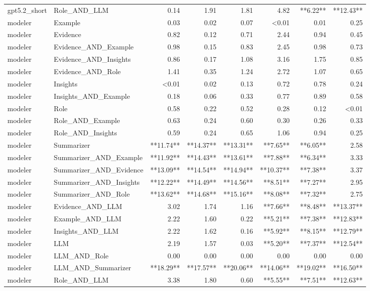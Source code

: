 \begin{tabular}{llrrrrrr}
gpt5.2_short & Role_AND_LLM & 0.14 & 1.91 & 1.81 & 4.82 & **6.22** & **12.43** \\
modeler & Example & 0.03 & 0.02 & 0.07 & <0.01 & 0.01 & 0.25 \\
modeler & Evidence & 0.82 & 0.12 & 0.71 & 2.44 & 0.94 & 0.45 \\
modeler & Evidence_AND_Example & 0.98 & 0.15 & 0.83 & 2.45 & 0.98 & 0.73 \\
modeler & Evidence_AND_Insights & 0.86 & 0.17 & 1.08 & 3.16 & 1.75 & 0.85 \\
modeler & Evidence_AND_Role & 1.41 & 0.35 & 1.24 & 2.72 & 1.07 & 0.65 \\
modeler & Insights & <0.01 & 0.02 & 0.13 & 0.72 & 0.78 & 0.24 \\
modeler & Insights_AND_Example & 0.18 & 0.06 & 0.33 & 0.77 & 0.89 & 0.58 \\
modeler & Role & 0.58 & 0.22 & 0.52 & 0.28 & 0.12 & <0.01 \\
modeler & Role_AND_Example & 0.63 & 0.24 & 0.60 & 0.30 & 0.26 & 0.33 \\
modeler & Role_AND_Insights & 0.59 & 0.24 & 0.65 & 1.06 & 0.94 & 0.25 \\
modeler & Summarizer & **11.74** & **14.37** & **13.31** & **7.65** & **6.05** & 2.58 \\
modeler & Summarizer_AND_Example & **11.92** & **14.43** & **13.61** & **7.88** & **6.34** & 3.33 \\
modeler & Summarizer_AND_Evidence & **13.09** & **14.54** & **14.94** & **10.37** & **7.38** & 3.37 \\
modeler & Summarizer_AND_Insights & **12.22** & **14.49** & **14.56** & **8.51** & **7.27** & 2.95 \\
modeler & Summarizer_AND_Role & **13.62** & **14.68** & **15.16** & **8.08** & **7.32** & 2.75 \\
modeler & Evidence_AND_LLM & 3.02 & 1.74 & 1.16 & **7.66** & **8.48** & **13.37** \\
modeler & Example_AND_LLM & 2.22 & 1.60 & 0.22 & **5.21** & **7.38** & **12.83** \\
modeler & Insights_AND_LLM & 2.22 & 1.62 & 0.16 & **5.92** & **8.15** & **12.79** \\
modeler & LLM & 2.19 & 1.57 & 0.03 & **5.20** & **7.37** & **12.54** \\
modeler & LLM_AND_Role & 0.00 & 0.00 & 0.00 & 0.00 & 0.00 & 0.00 \\
modeler & LLM_AND_Summarizer & **18.29** & **17.57** & **20.06** & **14.06** & **19.02** & **16.50** \\
modeler & Role_AND_LLM & 3.38 & 1.80 & 0.60 & **5.55** & **7.51** & **12.63** \\
\bottomrule
\end{tabular}
